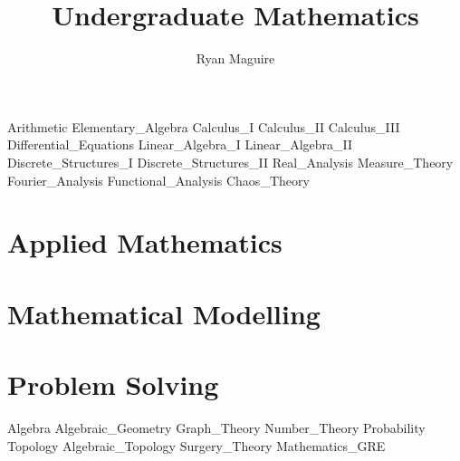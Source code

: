 \documentclass[crop=false,class=book,oneside]{standalone}
\begin{document}
    \newif\ifmathcourses
    \ifx\ifcourses\undefined
        \title{Undergraduate Mathematics}
        \author{Ryan Maguire}
        \date{\vspace{-5ex}}
        \maketitle
        \tableofcontents
        \listoffigures
        \listoftables
        \clearpage
    \fi
    {Arithmetic}
    {Elementary_Algebra}
    {Calculus_I}
    {Calculus_II}
    {Calculus_III}
    {Differential_Equations}
    {Linear_Algebra_I}
    {Linear_Algebra_II}
    {Discrete_Structures_I}
    {Discrete_Structures_II}
    {Real_Analysis}
    {Measure_Theory}
    {Fourier_Analysis}
    {Functional_Analysis}
    {Chaos_Theory}
    \chapter{Applied Mathematics}
    \chapter{Mathematical Modelling}
    \chapter{Problem Solving}
    {Algebra}
    {Algebraic_Geometry}
    {Graph_Theory}
    {Number_Theory}
    {Probability}
    {Topology}
    {Algebraic_Topology}
    {Surgery_Theory}
    {Mathematics_GRE}
\end{document}
